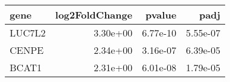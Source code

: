 \begin{tabular}{lrrr}
\toprule
  gene &  log2FoldChange &   pvalue &     padj \\
\midrule
LUC7L2 &        3.30e+00 & 6.77e-10 & 5.55e-07 \\
 CENPE &        2.34e+00 & 3.16e-07 & 6.39e-05 \\
 BCAT1 &        2.31e+00 & 6.01e-08 & 1.79e-05 \\
\bottomrule
\end{tabular}
